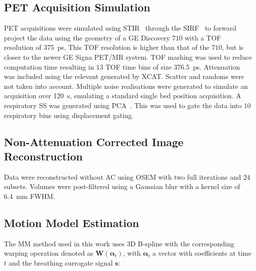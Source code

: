     \vspace{-0.5cm}
    
    \subsection{PET Acquisition Simulation} \label{sec:pet_acquisition_simulation}
        \gls{PET} acquisitions were simulated %
        using \gls{STIR}~\cite{Thielemans2012, Efthimiou2018} through the \gls{SIRF}~\cite{Ovtchinnikov2019CCPPETMRSIRF} to forward project the data using the geometry of a \gls{GE} Discovery $710$ with a \gls{TOF} resolution of \SI{375}{\pico\second}. This \gls{TOF} resolution is higher than that of the $710$, but is closer to the newer \gls{GE} Signa PET/MR system. \gls{TOF} mashing was used to reduce computation time resulting in $13$ \gls{TOF} time bins of size \SI{376.5}{\pico\second}. Attenuation was included using the relevant  generated by \gls{XCAT}. Scatter and randoms were not taken into account. Multiple noise realisations were generated to simulate an acquisition over \SI{120}{\second}, emulating a standard single bed position acquisition. A respiratory \gls{SS} was generated using \gls{PCA}~\cite{Thielemans2011}.
        This was used to gate the data into $10$ respiratory bins using displacement gating.%
    
    \vspace{-0.5cm}
    
    \subsection{Non-Attenuation Corrected Image Reconstruction} \label{sec:non-attenuation_corrected_image_reconstruction}
        Data were reconstructed without \gls{AC} using \gls{OSEM} with two full iterations and $24$ subsets.%
        Volumes were post-filtered using a Gaussian blur with a kernel size of \SI{6.4}{\milli\metre} \gls{FWHM}.
    
    \vspace{-0.5cm}
    
    \subsection{Motion Model Estimation} \label{sec:motion_model_estimation}
        The \gls{MM} method used in this work uses \gls{3D} B-spline  with the corresponding warping operation denoted as $\mathbf{W}(\mathbf{\alpha}_t)$, with $\mathbf{\alpha}_t$ a vector with coefficients at time $t$ and the breathing surrogate signal $\mathbf{s}$:
    

